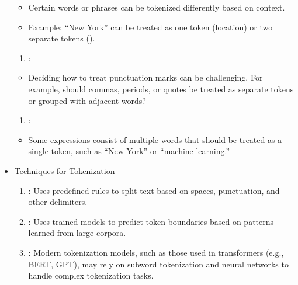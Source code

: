 \documentclass[letterpaper,11pt,english]{sphinxmanual}
\begin{document}
\begin{itemize}
\begin{enumerate}
\end{enumerate}
\begin{itemize}
\item {} 
\sphinxAtStartPar
Certain words or phrases can be tokenized differently based on context.

\item {} 
\sphinxAtStartPar
Example: “New York” can be treated as one token (location) or two separate tokens ().

\end{itemize}
\begin{enumerate}
%
\setcounter{enumi}{1}
\item {} 
\sphinxAtStartPar
{}:

\end{enumerate}
\begin{itemize}
\item {} 
\sphinxAtStartPar
Deciding how to treat punctuation marks can be challenging. For example, should commas, periods,
or quotes be treated as separate tokens or grouped with adjacent words?

\end{itemize}
\begin{enumerate}
%
\setcounter{enumi}{2}
\item {} 
\sphinxAtStartPar
{}:

\end{enumerate}
\begin{itemize}
\item {} 
\sphinxAtStartPar
Some expressions consist of multiple words that should be treated as a single token, such as “New York” or “machine learning.”

\end{itemize}

\item {} 
\sphinxAtStartPar
Techniques for Tokenization
\begin{enumerate}
%
\item {} 
\sphinxAtStartPar
{}: Uses predefined rules to split text based on spaces, punctuation, and other delimiters.

\item {} 
\sphinxAtStartPar
{}: Uses trained models to predict token boundaries based on patterns learned from large corpora.

\item {} 
\sphinxAtStartPar
{}: Modern tokenization models, such as those used in transformers (e.g., BERT, GPT), may rely on subword tokenization and neural networks to handle complex tokenization tasks.

\end{enumerate}

\end{itemize}
\end{document}
